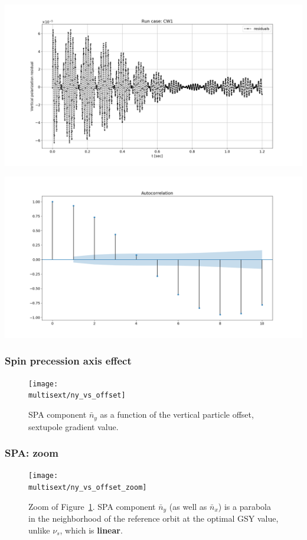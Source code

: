 \documentclass{beamer}
\newcommand{\home}{\string~}
\newcommand{\Artem}{\home/REPOS/COSYINF/img/Artem}
\newcommand{\multisext}{\Artem/multisext_test}
\begin{document}
\begin{frame}
  \centering
  \includegraphics[height=.5\paperheight, trim=0 25 0 25, clip]{RESID_VS_TIME}
  
  \includegraphics[height=.5\paperheight, trim=0 25 0 25, clip]{RESID_AUTOCORR}
\end{frame}

\begin{frame}\frametitle{Spin precession axis effect}
  \begin{figure}[H]
    \centering
    \texttt{[image: \\multisext/ny\_vs\_offset]}
    \caption{SPA component $\bar n_y$ as a function of the vertical particle offset, sextupole gradient value.\label{fig:DECOH_full_ny}}
  \end{figure}
\end{frame}

\begin{frame}\frametitle{SPA: zoom}
  \begin{figure}[H]
    \texttt{[image: \\multisext/ny\_vs\_offset\_zoom]}
    \caption{Zoom of Figure~\ref{fig:DECOH_full_ny}. SPA component $\bar
      n_y$ (as well as $\bar n_x$) is a parabola in the neighborhood of the reference orbit at
      the optimal GSY value, unlike $\nu_s$, which is \textbf{linear}.}
  \end{figure}
\end{frame}
\end{document}
